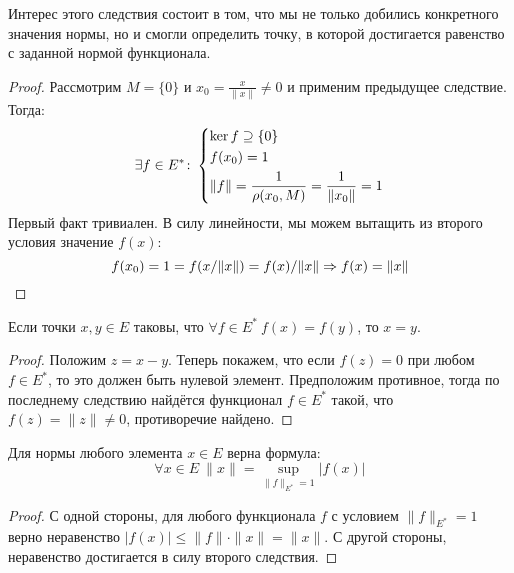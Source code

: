 \begin{anote}
	Интерес этого следствия состоит в том, что мы не только добились конкретного значения нормы, но и смогли определить точку, в которой достигается равенство с заданной нормой функционала.
\end{anote}

\begin{proof}
	Рассмотрим $M = \{0\}$ и $x_0 = \frac{x}{\|x\|} \neq 0$ и применим предыдущее следствие. Тогда:
	\[
		\exists f \in E^* \colon \left\{ \begin{aligned} 
			&{\ker f \supseteq \{0\}}
			\\
			&{f(x_0) = 1}
			\\
			&{\|f\| = \frac{1}{\rho(x_0, M)} = \frac{1}{\|x_0\|} = 1}
		 \end{aligned} \right.
	\]
	Первый факт тривиален. В силу линейности, мы можем вытащить из второго условия значение $f(x)$:
	\[
		f(x_0) = 1 = f(x / \|x\|) = f(x) / \|x\| \Rightarrow f(x) = \|x\|
	\]
\end{proof}

\begin{corollary}
	Если точки $x, y \in E$ таковы, что $\forall f \in E^*\ f(x) = f(y)$, то $x = y$.
\end{corollary}

\begin{proof}
	Положим $z = x - y$. Теперь покажем, что если $f(z) = 0$ при любом $f \in E^*$, то это должен быть нулевой элемент. Предположим противное, тогда по последнему следствию найдётся функционал $f \in E^*$ такой, что $f(z) = \|z\| \neq 0$, противоречие найдено.
\end{proof}

\begin{corollary}
	Для нормы любого элемента $x \in E$ верна формула:
	\[
		\forall x \in E\ \|x\| = \sup_{\|f\|_{E^*} =  1} |f(x)|
	\]
\end{corollary}

\begin{proof}
	С одной стороны, для любого функционала $f$ с условием $\|f\|_{E^*} = 1$ верно неравенство $|f(x)| \le \|f\| \cdot \|x\| = \|x\|$. С другой стороны, неравенство достигается в силу второго следствия.
\end{proof}

